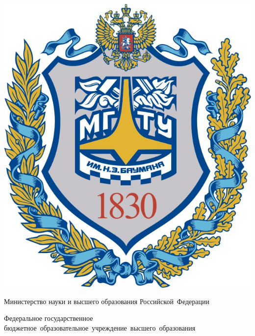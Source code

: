 \begin{titlepage}
    \fontsize{12pt}{12pt}\selectfont

    \noindent
    \begin{center}
            \begin{minipage}{0.14\textwidth}
                \includegraphics[width=\linewidth]{img/bmstu_logo.jpg}
            \end{minipage}
            \begin{minipage}{0.85\textwidth}\centering\bfseries
                {
                    \linespread{1}\selectfont
                    \vspace{0.1cm}
                    {Министерство науки и высшего образования Российской~Федерации}

                    {Федеральное государственное бюджетное~образовательное~учреждение~высшего~образования}

}
\end{minipage}
\end{center}
\end{titlepage}
